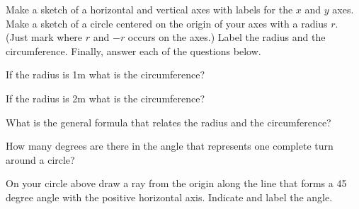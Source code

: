 
\begin{problem}
\item Make a sketch of a horizontal and vertical axes with labels for
  the $x$ and $y$ axes. Make a sketch of a circle centered on the
  origin of your axes with a radius $r$. (Just mark where $r$ and $-r$
  occurs on the axes.)  Label the radius and the
  circumference. Finally, answer each of the questions below.

  \vfill

  \begin{subproblem}
  \item If the radius is 1m what is the circumference?
    \vspace{4em}
  \item If the radius is 2m what is the circumference?
    \vspace{4em}
  \item What is the general formula that relates the radius and the circumference?
    \vspace{4em}
  \item How many degrees are there in the angle that represents one
    complete turn around a circle?  
    \vspace{4em}
  \item On your circle above draw a ray from the origin along the line
    that forms a 45 degree angle with the positive horizontal
    axis. Indicate and label the angle.
  \end{subproblem}
\end{problem}


